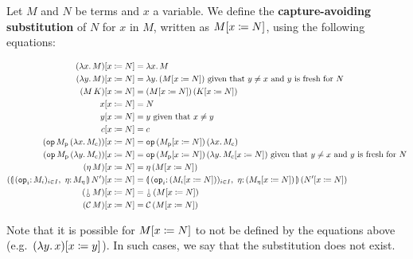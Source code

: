 \begin{definition}
  Let $M$ and $N$ be terms and $x$ a variable. We define the
  \textbf{capture-avoiding substitution} of $N$ for $x$ in $M$, written as
  $M[x \coloneqq N]$, using the following equations:

  \begin{align*}
    \subst{(\lam{x}{M})}{x}{N} &= \lam{x}{M} \\
    \subst{(\lam{y}{M})}{x}{N} &= \lam{y}{(\subst{M}{x}{N})} \textrm{ given
      that } y \neq x \textrm{ and $y$ is fresh for $N$} \\
    \subst{(\ap{M}{K})}{x}{N} &= \ap{(\subst{M}{x}{N})}{(\subst{K}{x}{N})} \\
    \subst{x}{x}{N} &= N \\
    \subst{y}{x}{N} &= y \textrm{ given that } x \neq y \\
    \subst{c}{x}{N} &= c \\
    \subst{(\app{\op{op}}{M_\petitp}{(\lam{x}{M_\petitc})})}{x}{N} &= \app{\op{op}}
      {(\subst{M_\petitp}{x}{N})}{(\lam{x}{M_\petitc})} \\
    \subst{(\app{\op{op}}{M_\petitp}{(\lam{y}{M_\petitc})})}{x}{N} &= \app{\op{op}}
      {(\subst{M_\petitp}{x}{N})}{(\lam{y}{\subst{M_\petitc}{x}{N}})}
      \textrm{ given that } y \neq x \textrm{ and $y$ is fresh for $N$} \\
    \subst{(\ap{\eta}{M})}{x}{N} &= \ap{\eta}{(\subst{M}{x}{N})} \\
    \subst{(\ap{\cibanana}{N'})}{x}{N} &= \ap{\banana{(\onto{\op{op}_i}
      (\subst{M_i}{x}{N}))_{i \in I},\ \onto{\eta} (\subst{M_\eta}{x}{N})}}
      {(\subst{N'}{x}{N})} \\
    \subst{(\ap{\cherry}{M})}{x}{N} &= \ap{\cherry}{(\subst{M}{x}{N})} \\
    \subst{(\ap{\CC}{M})}{x}{N} &= \ap{\CC}{(\subst{M}{x}{N})}
  \end{align*}

  Note that it is possible for $M[x \coloneqq N]$ to not be defined by the
  equations above (e.g.\ $(\lambda y.\, x)[x \coloneqq y]$). In such cases, we
  say that the substitution does not exist.
\end{definition}

